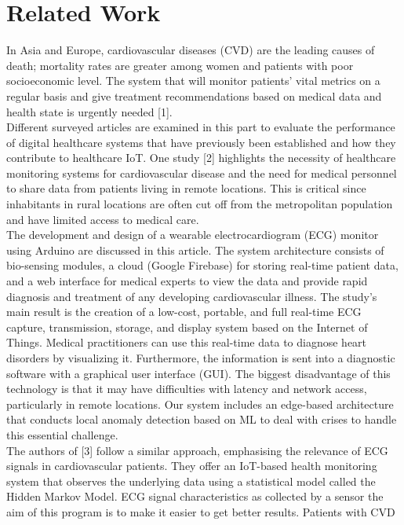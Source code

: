 \documentclass{bmcart}
\begin{document}
\section*{Related Work}
In Asia and Europe, cardiovascular diseases (CVD) are the leading causes of
death; mortality rates are greater among women and patients with poor
socioeconomic level. The system that will monitor patients' vital metrics on a
regular basis and give treatment recommendations based on medical data and
health state is urgently needed [1].\\
Different surveyed articles are examined in this part to evaluate the
performance of digital healthcare systems that have previously been established
and how they contribute to healthcare IoT. One study [2] highlights the
necessity of healthcare monitoring systems for cardiovascular disease and the
need for medical personnel to share data from patients living in remote
locations. This is critical since inhabitants in rural locations are often cut
off from the metropolitan population and have limited access to medical care.\\
The development and design of a wearable electrocardiogram (ECG) monitor using
Arduino are discussed in this article. The system architecture consists of
bio-sensing modules, a cloud (Google Firebase) for storing real-time patient
data, and a web interface for medical experts to view the data and provide rapid
diagnosis and treatment of any developing cardiovascular illness. The study's
main result is the creation of a low-cost, portable, and full real-time ECG
capture, transmission, storage, and display system based on the Internet of
Things. Medical practitioners can use this real-time data to diagnose heart
disorders by   visualizing it. Furthermore, the information is sent into a
diagnostic software with a graphical user interface (GUI). The biggest
disadvantage of this technology is that it may have difficulties with latency
and network access, particularly in remote locations. Our system includes an
edge-based architecture that conducts local anomaly detection based on ML to
deal with crises to handle this essential challenge.\\
The authors of [3] follow a similar approach, emphasising the relevance of ECG
signals in cardiovascular patients. They offer an IoT-based health monitoring
system that observes the underlying data using a statistical model called the
Hidden Markov Model. ECG signal characteristics as collected by a sensor the aim
of this program is to make it easier to get better results. Patients with CVD
\end{document}

